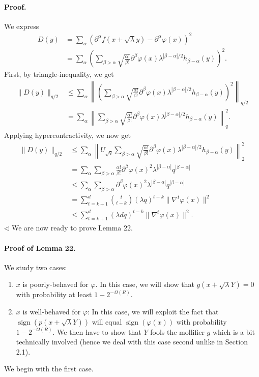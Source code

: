 \paragraph{Proof.} We express
\begin{align*}
D(y)&=\sum_\alpha(\partial^\alpha f(x+\sqrt\lambda y)-\partial^\alpha\varphi(x))^2\\
&=\sum_\alpha\left(\sum_{\beta>\alpha}\sqrt{\frac{\alpha!}{\beta!}}\partial^\beta\varphi(x)\lambda^{|\beta-\alpha|/2}h_{\beta-\alpha}(y)\right)^2.
\end{align*}
First, by triangle-inequality, we get
\begin{align*}
\|D(y)\|_{q/2}&\leq\sum_\alpha\left\|\left(\sum_{\beta>\alpha}\sqrt{\frac{\alpha!}{\beta!}}\partial^\beta\varphi(x)\lambda^{|\beta-\alpha|/2}h_{\beta-\alpha}(y)\right)^2\right\|_{q/2}\\
&=\sum_\alpha\left\|\sum_{\beta>\alpha}\sqrt{\frac{\alpha!}{\beta!}}\partial^\beta\varphi(x)\lambda^{|\beta-\alpha|/2}h_{\beta-\alpha}(y)\right\|_q^2.
\end{align*}
Applying hypercontractivity, we now get
\begin{align*}
\|D(y)\|_{q/2}&\leq\sum_\alpha\left\|U_{\sqrt q}\sum_{\beta>\alpha}\sqrt{\frac{\alpha!}{\beta!}}\partial^\beta\varphi(x)\lambda^{|\beta-\alpha|/2}h_{\beta-\alpha}(y)\right\|_2^2\\
&=\sum_\alpha\sum_{\beta>\alpha}\frac{\alpha!}{\beta!}\partial^\beta\varphi(x)^2\lambda^{|\beta-\alpha|}q^{|\beta-\alpha|}\\
&\leq\sum_\alpha\sum_{\beta>\alpha}\partial^\beta\varphi(x)^2\lambda^{|\beta-\alpha|}q^{|\beta-\alpha|}\\
&=\sum_{t=k+1}^d\binom t{t-k}(\lambda q)^{t-k}\|\nabla^t\varphi(x)\|^2\\
&\leq\sum_{t=k+1}^d(\lambda dq)^{t-k}\|\nabla^t\varphi(x)\|^2.
\end{align*}\hfill$\triangleleft$
We are now ready to prove Lemma 22.
\paragraph{Proof of Lemma 22.} We study two cases:
\begin{enumerate}
\item $x$ is poorly-behaved for $\varphi$. In this case, we will show that $g(x+\sqrt\lambda Y)=0$ with probability at least $1-2^{-\Omega(R)}$.
\item $x$ is well-behaved for $\varphi$: In this case, we will exploit the fact that $\operatorname{sign}(p(x+\sqrt\lambda Y))$ will equal $\operatorname{sign}(\varphi(x))$ with probability $1-2^{-\Omega(R)}$. We then have to show that $Y$ fools the mollifier $g$ which is a bit technically involved (hence we deal with this case second unlike in Section 2.1).
\end{enumerate}
We begin with the first case.
